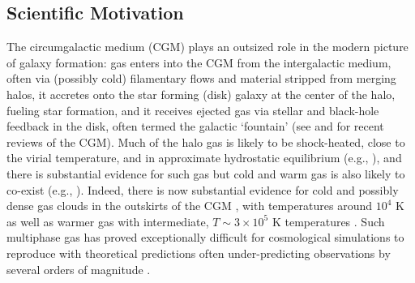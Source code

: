 \documentclass[11pt,letterpaper,english]{article}
\begin{document}
\vspace{-.25in}
\subsection{Scientific Motivation}
\vspace{-.2in}

The circumgalactic medium (CGM) plays an outsized role in the modern picture of galaxy formation: gas enters into the CGM from the intergalactic medium, often via (possibly cold) filamentary flows and material stripped from merging halos, it accretes onto the star forming (disk) galaxy at the center of the halo, fueling star formation, and it receives ejected gas via stellar and black-hole feedback in the disk, often termed the galactic `fountain' (see \cite{Tumlinson17} and \cite{Putman12} for recent reviews of the CGM).  Much of the halo gas is likely to be shock-heated, close to the virial temperature, and in approximate hydrostatic equilibrium (e.g., \cite{White78, Fielding17}), and there is substantial evidence for such gas \cite{Bregman07} but cold and warm gas is also likely to co-exist (e.g., \cite{Keres09, Wakker2009, Rigby02}).  Indeed, there is now substantial evidence for cold and possibly dense gas clouds in the outskirts of the CGM \cite{Tumlinson13, Werk14, Lau16}, with temperatures around $10^4$ K as well as warmer gas with intermediate, $T \sim 3 \times 10^5$ K temperatures \cite{Chen2009, Prochaska2011}.  Such multiphase gas has proved exceptionally difficult for cosmological simulations to reproduce with theoretical predictions often under-predicting observations by several orders of magnitude \cite{Hummels2013}.  
\end{document}

